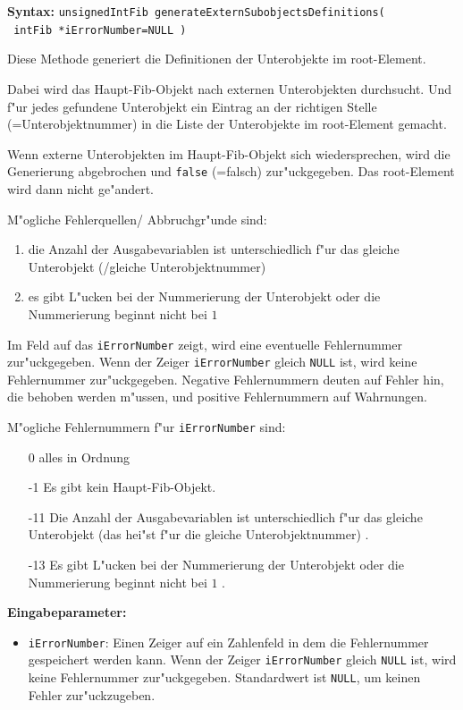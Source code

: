 \textbf{Syntax:} \verb|unsignedIntFib generateExternSubobjectsDefinitions(| \\\verb| intFib *iErrorNumber=NULL )|

\bigskip\noindent
Diese Methode generiert die Definitionen der Unterobjekte im root-Element.

Dabei wird das Haupt-Fib-Objekt nach externen Unterobjekten durchsucht. Und f"ur jedes gefundene Unterobjekt ein Eintrag an der richtigen Stelle (=Unterobjektnummer) in die Liste der Unterobjekte im root-Element gemacht.

Wenn externe Unterobjekten im Haupt-Fib-Objekt sich wiedersprechen, wird die Generierung abgebrochen und \verb|false| (=falsch) zur"uckgegeben. Das root-Element wird dann nicht ge"andert.

\bigskip\noindent
M"ogliche Fehlerquellen/ Abbruchgr"unde sind:
\begin{enumerate}
 \item die Anzahl der Ausgabevariablen ist unterschiedlich f"ur das gleiche Unterobjekt (/gleiche Unterobjektnummer)
 \item es gibt L"ucken bei der Nummerierung der Unterobjekt oder die Nummerierung beginnt nicht bei $1$
\end{enumerate}


Im Feld auf das \verb|iErrorNumber| zeigt, wird eine eventuelle Fehlernummer zur"uckgegeben. Wenn der Zeiger \verb|iErrorNumber| gleich \verb|NULL| ist, wird keine Fehlernummer zur"uckgegeben. Negative Fehlernummern deuten auf Fehler hin, die behoben werden m"ussen, und positive Fehlernummern auf Wahrnungen.

\noindent
M"ogliche Fehlernummern f"ur \verb|iErrorNumber| sind:
\begin{itemize}
 \item [0] alles in Ordnung
 \item [-1] Es gibt kein Haupt-Fib-Objekt.
 \item [-11] Die Anzahl der Ausgabevariablen ist unterschiedlich f"ur das gleiche Unterobjekt (das hei"st f"ur die gleiche Unterobjektnummer) .
 \item [-13] Es gibt L"ucken bei der Nummerierung der Unterobjekt oder die Nummerierung beginnt nicht bei $1$ .
\end{itemize}


\bigskip\noindent
\textbf{Eingabeparameter:}
\begin{itemize}
 \item \verb|iErrorNumber|: Einen Zeiger auf ein Zahlenfeld in dem die Fehlernummer gespeichert werden kann. Wenn der Zeiger \verb|iErrorNumber| gleich \verb|NULL| ist, wird keine Fehlernummer zur"uckgegeben. Standardwert ist \verb|NULL|, um keinen Fehler zur"uckzugeben.
\end{itemize}


